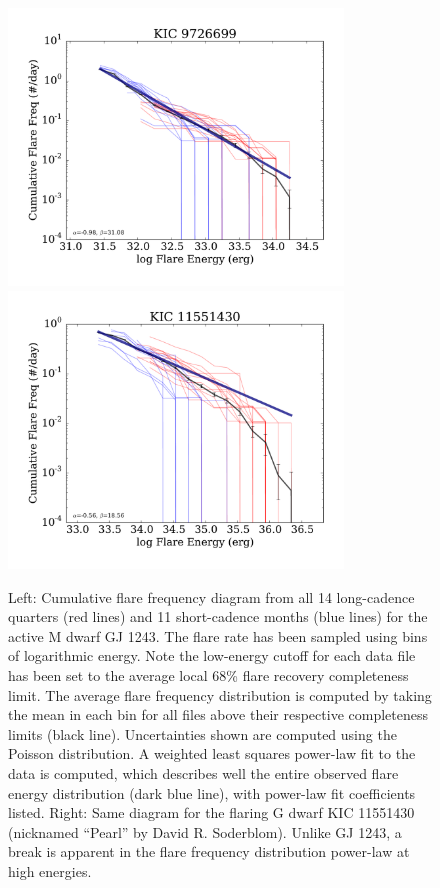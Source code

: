 \documentclass[twocolumn]{aastex6}
\begin{document}
\begin{figure}[!t]
\centering
\includegraphics[width=3.5in]{fig6a}
\includegraphics[width=3.5in]{fig6b}
\caption{
Left: Cumulative flare frequency diagram from all 14 long-cadence quarters (red lines) and 11 short-cadence months (blue lines) for the active M dwarf GJ 1243. The flare rate has been sampled using bins of logarithmic energy. Note the low-energy cutoff for each data file has been set to the average local 68\% flare recovery completeness limit. The average flare frequency distribution is computed by taking the mean in each bin for all files above their respective completeness limits (black line). Uncertainties shown are computed using the Poisson distribution. A weighted least squares power-law fit to the data is computed, which describes well the entire observed flare energy distribution (dark blue line), with power-law fit coefficients listed.
Right: Same diagram for the flaring G dwarf KIC 11551430 (nicknamed ``Pearl'' by David R. Soderblom). %
Unlike GJ 1243, a break is apparent in the flare frequency distribution power-law at high energies.
}
\label{fig:ffd}
\end{figure}
\end{document}
